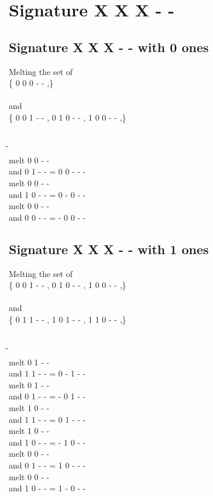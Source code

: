 \documentclass{article}
\begin{document}
\section{Signature X X X - - }
\subsection{Signature X X X - - with 0 ones}
Melting the set of\\
\{ 0  0  0  -  - ,\}\\\\
and\\
\{ 0  0  1  -  - , 0  1  0  -  - , 1  0  0  -  - ,\}\\\\
\begin{tabbing}
\hspace{3cm}\=\hspace{3cm}\=\hspace{3cm}\\[1cm]
melt  0  0  -  - \\
and  0  1  -  - \>
 =  0  0  -  -  - \\[1mm]
melt  0  0  -  - \\
and  1  0  -  - \>
 =  0  -  0  -  - \\[1mm]
melt  0  0  -  - \\
and  0  0  -  - \>
 =  -  0  0  -  - \\[1mm]
\end{tabbing}
\newpage
\subsection{Signature X X X - - with 1 ones}
Melting the set of\\
\{ 0  0  1  -  - , 0  1  0  -  - , 1  0  0  -  - ,\}\\\\
and\\
\{ 0  1  1  -  - , 1  0  1  -  - , 1  1  0  -  - ,\}\\\\
\begin{tabbing}
\hspace{3cm}\=\hspace{3cm}\=\hspace{3cm}\\[1cm]
melt  0  1  -  - \\
and  1  1  -  - \>
 =  0  -  1  -  - \\[1mm]
melt  0  1  -  - \\
and  0  1  -  - \>
 =  -  0  1  -  - \\[1mm]
melt  1  0  -  - \\
and  1  1  -  - \>
 =  0  1  -  -  - \\[1mm]
melt  1  0  -  - \\
and  1  0  -  - \>
 =  -  1  0  -  - \\[1mm]
melt  0  0  -  - \\
and  0  1  -  - \>
 =  1  0  -  -  - \\[1mm]
melt  0  0  -  - \\
and  1  0  -  - \>
 =  1  -  0  -  - \\[1mm]
\end{tabbing}
\newpage
\end{document}
